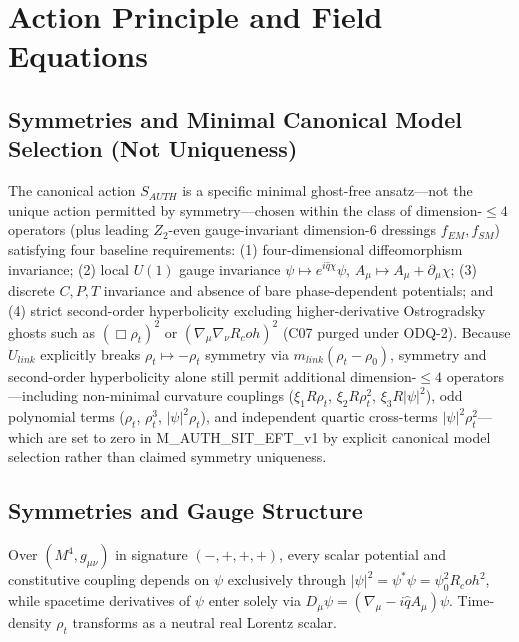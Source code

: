 \documentclass[american,11pt,letterpaper]{article}
\newcommand{\Rcoh}{R_{\mathrm{coh}}}
\def\mathbb#1{#1}%
\def\mathcal#1{#1}%
\def\mathrm#1{#1}%
\def\texttt#1{#1}%
\def\emph#1{#1}%
\def\Rcoh{R_coh}%
\begin{document}
\section{Action Principle and Field Equations}
\label{sec:action-principle}
\label{sec:core-action}

\subsection{Symmetries and Minimal Canonical Model Selection (Not Uniqueness)}

The canonical action $S_{\mathrm{AUTH}}$ is a \emph{specific minimal ghost-free ansatz}---not the unique action permitted by symmetry---chosen within the class of dimension-$\le 4$ operators (plus leading $\mathbb{Z}_2$-even gauge-invariant dimension-6 dressings $f_{\mathrm{EM}}, f_{\mathrm{SM}}$) satisfying four baseline requirements: (1) four-dimensional diffeomorphism invariance; (2) local $U(1)$ gauge invariance $\psi \mapsto e^{i\hat{q}\chi}\psi$, $A_\mu \mapsto A_\mu + \partial_\mu\chi$; (3) discrete $C, P, T$ invariance and absence of bare phase-dependent potentials; and (4) strict second-order hyperbolicity excluding higher-derivative Ostrogradsky ghosts such as $(\Box\rho_t)^2$ or $(\nabla_\mu\nabla_\nu\Rcoh)^2$ (\texttt{C07} purged under \texttt{ODQ-2}). Because $U_{\mathrm{link}}$ explicitly breaks $\rho_t \mapsto -\rho_t$ symmetry via $m_{\mathrm{link}}(\rho_t - \rho_0)$, symmetry and second-order hyperbolicity alone still permit additional dimension-$\le 4$ operators---including non-minimal curvature couplings ($\xi_1 R\rho_t$, $\xi_2 R\rho_t^2$, $\xi_3 R|\psi|^2$), odd polynomial terms ($\rho_t$, $\rho_t^3$, $|\psi|^2\rho_t$), and independent quartic cross-terms $|\psi|^2\rho_t^2$---which are set to zero in \texttt{M\_AUTH\_SIT\_EFT\_v1} by explicit canonical model selection rather than claimed symmetry uniqueness.

\subsection{Symmetries and Gauge Structure}

Over $(\mathcal{M}^4, g_{\mu\nu})$ in signature $(-,+,+,+)$, every scalar potential and constitutive coupling depends on $\psi$ exclusively through $|\psi|^2 = \psi^*\psi = \psi_0^2\Rcoh^2$, while spacetime derivatives of $\psi$ enter solely via $D_\mu\psi = (\nabla_\mu - i\hat{q}A_\mu)\psi$. Time-density $\rho_t$ transforms as a neutral real Lorentz scalar.
\end{document}
